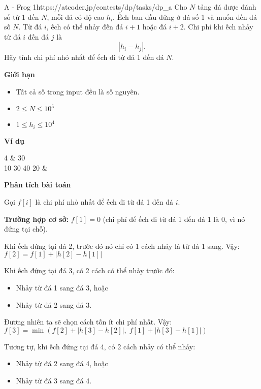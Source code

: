 \begin{baitap}{A - Frog 1}{https://atcoder.jp/contests/dp/tasks/dp\_a}
Cho $N$ tảng đá được đánh số từ 1 đến $N$, mỗi đá có độ cao $h_i$. 
Ếch ban đầu đứng ở đá số 1 và muốn đến đá số $N$. 
Từ đá $i$, ếch có thể nhảy đến đá $i+1$ hoặc đá $i+2$. 
Chi phí khi ếch nhảy từ đá $i$ đến đá $j$ là 
\[
    |h_i - h_j|.
\]
Hãy tính chi phí nhỏ nhất để ếch đi từ đá 1 đến đá $N$.

\textbf{Giới hạn}
\begin{itemize}
    \item Tất cả số trong input đều là số nguyên.
    \item $2 \leq N \leq 10^5$
    \item $1 \leq h_i \leq 10^4$
\end{itemize}

\textbf{Ví dụ}

\begin{sampleio}
4 & 30 \\ 
10 30 40 20 &  \\
\end{sampleio}

\end{baitap}

\textbf{Phân tích bài toán}

Gọi \( f[i] \) là chi phí nhỏ nhất để ếch đi từ đá 1 đến đá \( i \).

\textbf{Trường hợp cơ sở:} $f[1] = 0$ (chi phí để ếch đi từ đá 1 đến đá 1 là 0, vì nó đứng tại chỗ). 

Khi ếch đứng tại đá 2, trước đó nó chỉ có 1 cách nhảy là từ đá 1 sang.  
Vậy: $f[2] = f[1] + |h[2] - h[1]|$


Khi ếch đứng tại đá 3, có 2 cách có thể nhảy trước đó:

\begin{itemize}
    \item Nhảy từ đá 1 sang đá 3, hoặc
    \item Nhảy từ đá 2 sang đá 3.
\end{itemize}

Đương nhiên ta sẽ chọn cách tốn ít chi phí nhất.  
Vậy: $ f[3] = \min \left( f[2] + |h[3] - h[2]|, \; f[1] + |h[3] - h[1]| \right)$

Tương tự, khi ếch đứng tại đá 4, có 2 cách nhảy có thể nhảy:

\begin{itemize}
    \item Nhảy từ đá 2 sang đá 4, hoặc
    \item Nhảy từ đá 3 sang đá 4.
\end{itemize}

